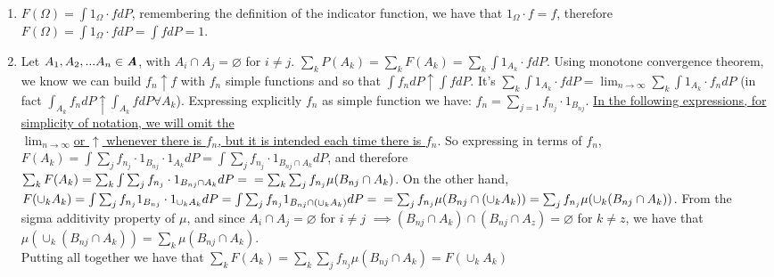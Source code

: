 \documentclass[12pt,mythesisstyle]{report}
\begin{document}
\begin{enumerate}
\item $F(\Omega)=\int 1_\Omega\cdot fdP$, remembering the definition of the indicator function, we have that $1_\Omega\cdot f=f$, therefore $F(\Omega)=\int 1_\Omega\cdot fdP=\int fdP=1$.\\
\item Let $A_1, A_2,...A_n\in\textbf{\textit{A}}$, with $A_i\cap A_j=\varnothing$ for $i\neq j$. $\sum_{k}P(A_k)=\sum_{k}F(A_k)=\sum_{k}\int 1_{A_k}\cdot fdP$. Using monotone convergence theorem, we know we can build $f_n\uparrow f$ with $f_n$ simple functions and so that $\int f_n dP\uparrow \int fdP$. It's $\displaystyle{\sum_{k}\int 1_{A_k}\cdot fdP=\lim_{n \to \infty}\sum_{k}\int 1_{A_k}\cdot f_ndP}$ (in fact $\int_{A_k} f_ndP\uparrow\int_{A_k} fdP \forall A_k$). Expressing explicitly $f_n$ as simple function we have: $f_n=\sum_{j=1}f_{n_j}\cdot 1_{B_{nj}}$. \underline{In the following expressions, for simplicity of notation, we will omit the}\\\underline{$\lim_{n \to \infty}$}\underline{or $\uparrow$ whenever there is $f_n$, but it is intended each time there is $f_n$}. So expressing in terms of $f_n$, $F(A_k)=\int\sum_j f_{n_j}\cdot 1_{B_{nj}}\cdot 1_{A_k}dP=\int\sum_j f_{n_j}\cdot 1_{B_{nj} \cap {A_k}}dP$, and therefore $\sum_k F(A_k)=\sum_k \int\sum_j f_{n_j}\cdot 1_{B_{nj} \cap {A_k}}dP=\\=\sum_k\sum_j f_{n_j}\mu(B_{nj} \cap {A_k})$. On the other hand,\\$F(\cup_k A_k)=\int \sum_j f_{n_j}1_{B_{nj}} \cdot 1_{\cup _k {A_k}}dP=\int \sum_j f_{n_j}1_{B_{nj}\cap (\cup _k {A_k})}dP=\\=\sum_j f_{n_j}\mu({B_{nj}\cap (\cup _k {A_k})})=\sum_j f_{n_j}\mu(\cup_k({B_{nj}\cap {A_k}}))$. From the sigma additivity property of $\mu$, and since $A_i\cap A_j=\varnothing$ for $i\neq j$ $\implies ({B_{nj}\cap {A_k}})\cap({B_{nj}\cap {A_z}})=\varnothing$ for $k\neq z$, we have that $\mu(\cup_k({B_{nj}\cap {A_k}}))=\sum_k\mu({B_{nj}\cap {A_k}})$.\\
Putting all together we have that $\sum_k F(A_k)=\sum_k\sum_j f_{n_j}\mu(B_{nj} \cap {A_k})=F(\cup_k A_k)$

\end{enumerate}
\end{document}
